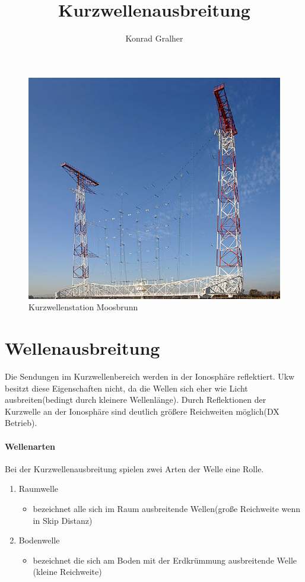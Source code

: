 \documentclass[fontzize=12pt,paper=a4,twoside=false]{article}
\title{Kurzwellenausbreitung}
\author{Konrad Gralher}
\begin{document}
\begin{titlepage}
    \bfseries\Huge{}    
    \begin{figure}
        \includegraphics[]{assets/640px-Moosbrunn_SW_Antenna}
        \caption{Kurzwellenstation Moosbrunn}  
    \end{figure}        
\end{titlepage}

\part[]{Wellenausbreitung}

Die Sendungen im Kurzwellenbereich werden in der Ionosphäre reflektiert. 
Ukw besitzt diese Eigenschaften nicht, da die Wellen sich eher wie Licht ausbreiten(bedingt durch kleinere Wellenlänge). Durch Reflektionen der Kurzwelle an der Ionosphäre
sind deutlich größere Reichweiten möglich(DX Betrieb).
\vspace{0.1cm}
\subsection[]{Wellenarten}
Bei der Kurzwellenausbreitung spielen zwei Arten der Welle eine Rolle.
\begin{enumerate}
    \item Raumwelle
    \begin{itemize}
        \item bezeichnet alle sich im Raum ausbreitende Wellen(große Reichweite wenn in Skip Distanz)
    \end{itemize}
    \item Bodenwelle
    \begin{itemize}
        \item bezeichnet die sich am Boden mit der Erdkrümmung ausbreitende Welle (kleine Reichweite)
    \end{itemize}
\end{enumerate}
\end{document}
